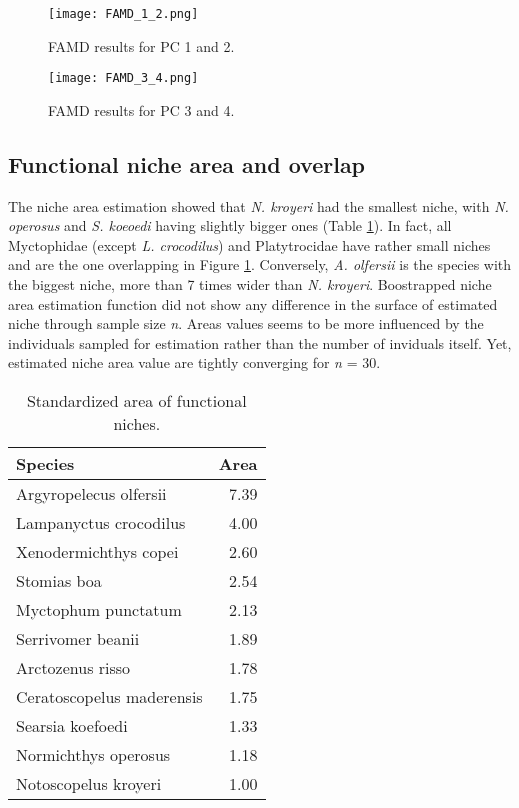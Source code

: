 \begin{figure} [!htbp]
	\begin{center}
		\texttt{[image: FAMD\_1\_2.png]}
	\end{center}
	\caption{FAMD results for PC 1 and 2.}
	\label{fig:famd12}
\end{figure}

\begin{figure} [!htbp]
	\begin{center}
		\texttt{[image: FAMD\_3\_4.png]}
	\end{center}
	\caption{FAMD results for PC 3 and 4.}
	\label{fig:famd34}
\end{figure}


\subsection{Functional niche area and overlap}
The niche area estimation showed that \textit{N. kroyeri} had the smallest niche, with \textit{N. operosus} and \textit{S. koeoedi} having slightly bigger ones (Table \ref{table:sp_area}). In fact, all Myctophidae (except \textit{L. crocodilus}) and Platytrocidae have rather small niches and are the one overlapping in Figure \ref{fig:famd12}. Conversely, \textit{A. olfersii} is the species with the biggest niche, more than 7 times wider than \textit{N. kroyeri}.
Boostrapped niche area estimation function did not show any difference in the surface of estimated niche through sample size \textit{n}. Areas values seems to be more influenced by the individuals sampled for estimation rather than the number of inviduals itself. Yet, estimated niche area value are tightly converging for \textit{n} = 30. 

\begin{table}[ht]
\centering
\caption{Standardized area of functional niches.}
\label{table:sp_area}
\begin{adjustbox}{max width=1.1\textwidth,center}
\begin{tabular}{lr}
  \hline
Species & Area \\ 
  \hline
Argyropelecus olfersii & 7.39 \\ 
  Lampanyctus crocodilus & 4.00 \\ 
  Xenodermichthys copei & 2.60 \\ 
  Stomias boa & 2.54 \\ 
  Myctophum punctatum & 2.13 \\ 
  Serrivomer beanii & 1.89 \\ 
  Arctozenus risso & 1.78 \\ 
  Ceratoscopelus maderensis & 1.75 \\ 
  Searsia koefoedi & 1.33 \\ 
  Normichthys operosus & 1.18 \\ 
  Notoscopelus kroyeri & 1.00 \\ 
   \hline
\end{tabular}
\end{adjustbox}
\end{table}

